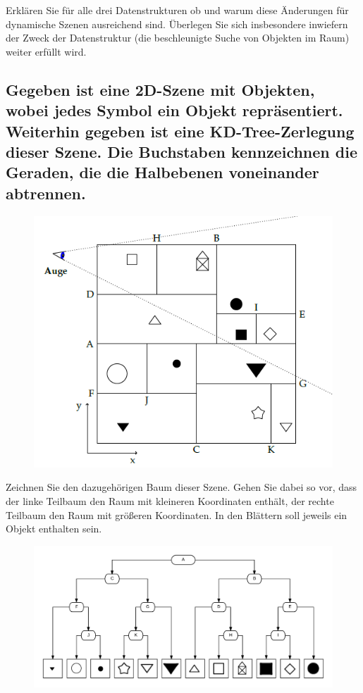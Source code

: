 \documentclass[a4paper,10pt,DIV=14]{article}
\begin{document}
Erklären Sie für alle drei Datenstrukturen ob und warum diese Änderungen für dynamische Szenen ausreichend sind. Überlegen Sie sich insbesondere inwiefern der Zweck der Datenstruktur (die beschleunigte Suche von Objekten im Raum) weiter erfüllt wird.

\subsection{Gegeben ist eine 2D-Szene mit Objekten, wobei jedes Symbol ein Objekt repräsentiert. Weiterhin gegeben ist eine KD-Tree-Zerlegung dieser Szene. Die Buchstaben kennzeichnen die Geraden, die die Halbebenen voneinander abtrennen.}

\begin{figure}[!htbp]
	\centering
	\includegraphics[]{scene}
\end{figure}

Zeichnen Sie den dazugehörigen Baum dieser Szene. Gehen Sie dabei so vor, dass der linke Teilbaum den Raum mit kleineren Koordinaten enthält, der rechte Teilbaum den Raum mit größeren Koordinaten. In den Blättern soll jeweils ein Objekt enthalten sein.

\begin{figure}[!htbp]
	\centering
	\includegraphics[width=1\linewidth]{kd}
\end{figure}
\end{document}
